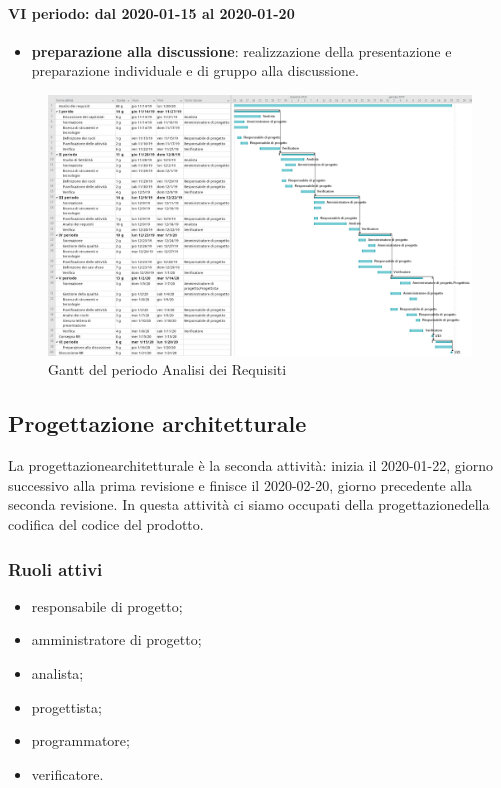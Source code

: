 \paragraph*{VI periodo: dal 2020-01-15 al 2020-01-20}
\begin{itemize}
	\item \textbf{preparazione alla discussione}: realizzazione della presentazione e preparazione individuale e di gruppo alla discussione.
\end{itemize}

\begin{landscape}
	\begin{figure}[H] 	
		\includegraphics[width=\linewidth]{./gantt/Analisi_dei_Requisiti_datax2.png}	
		\caption{Gantt del periodo Analisi dei Requisiti}	
	\end{figure}
\end{landscape}

\subsection{Progettazione architetturale}
La progettazione\glosp architetturale è la seconda attività: inizia il 2020-01-22, giorno successivo alla prima revisione e finisce il 2020-02-20, giorno precedente alla seconda revisione. In questa attività ci siamo occupati della progettazione\glosp della codifica del codice del prodotto\glo.

\subsubsection{Ruoli attivi}
\begin{itemize}
	\item responsabile di progetto\glo;
	\item amministratore di progetto\glo;
	\item analista;
	\item progettista;
	\item programmatore;
	\item verificatore.
\end{itemize}

